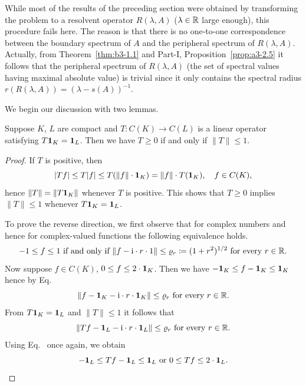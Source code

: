 While most of the results of the preceding section were obtained by transforming the problem to a resolvent operator $R(\lambda,A)$ ($\lambda \in \mathbb{R}$ large enough), this procedure fails here.
The reason is that there is no one-to-one correspondence between the boundary spectrum of\/ $A$ and the peripheral spectrum of\/ $R(\lambda,A)$.
Actually, from Theorem~\ref{thm:b3-1.1} and Part-I, Proposition~\ref{prop:a3-2.5} it follows that the peripheral spectrum of\/ $R(\lambda,A)$ (\ie the set of spectral values having maximal absolute value) is trivial since it only contains the spectral radius $r(R(\lambda,A)) = (\lambda - s(A))^{-1}$.

We begin our discussion with two lemmas.
\begin{lemma}\label{lem:b3-2.1}
	Suppose $K$, $L$ are compact and $T \colon C(K) \to C(L)$ is a linear operator satisfying $T \mathbf{1}_{K} = \mathbf{1}_{L}$.
	Then we have $T \geq 0$ if and only if\/ $\|T\| \leq 1$.
\end{lemma}
\begin{proof}
	If\/ $T$ is positive, then
	\begin{equation}\label{eq:b3-2.1}
	|Tf| \leq T|f| \leq T(\|f\|\cdot \1_{K}) = \|f\|\cdot T(\1_{K}), \quad f \in C(K) , 
	\end{equation}
	hence $\|T\| = \|T\mathbf{1}_{K}\|$ whenever $T$ is positive.
	This shows that $T \geq 0$ implies $\|T\| \leq 1$ whenever $T\mathbf{1}_{K} = \mathbf{1}_{L}$.
	
	To prove the reverse direction, we first observe that for complex numbers and hence for complex-valued functions the following equivalence holds.
	\begin{equation}\label{eq:b3-2.2}
	-1 \leq f \leq 1 \text{ if and only if } \|f - \im\cdot r\cdot 1\| \leq \rho_{r} \coloneq (1+r^{2})^{1/2} \text{ for every } r \in \R.
	\end{equation}
	Now suppose $f \in C(K)$, $0 \leq f \leq 2\cdot \1_{K}$.
	Then we have $-\1_{K} \leq f - \1_{K} \leq \1_{K}$ hence by Eq.~ 
    \[\|f - \1_{K} - \im\cdot r\cdot \1_{K}\| \leq \rho_{r}  \text{ for every } r \in \R .
    \]
	From $T\mathbf{1}_{K} = \mathbf{1}_{L}$ and $\|T\| \leq 1$ it follows that 
    \[
    \|Tf - \1_{L} - \im\cdot r\cdot \1_{L}\| \leq \rho_{r} \text{ for every } r \in \R .
    \]
	Using Eq.~ once again, we obtain 
\begin{equation*}
    -\1_{L} \leq Tf - \1_{L} \leq \1_{L}\text{ or } 0 \leq Tf \leq 2\cdot \1_{L}. 
    \qedhere
\end{equation*}
\end{proof}
